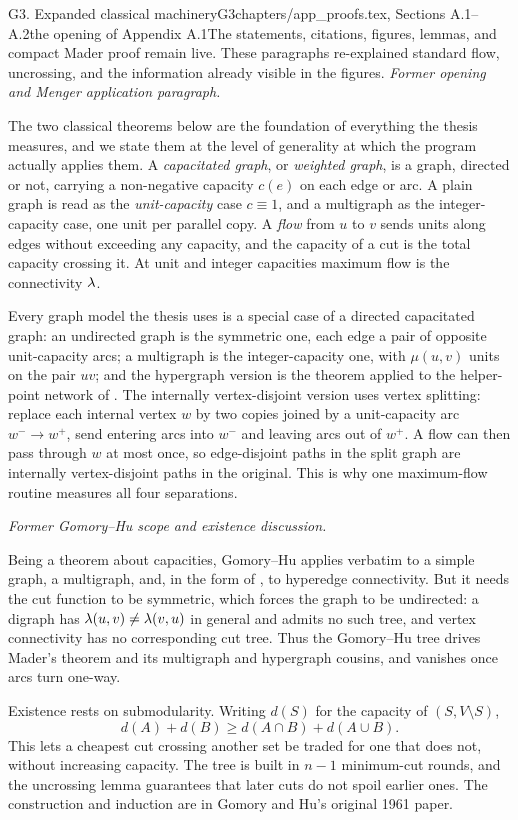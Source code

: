 \begin{offcutrewrite}{G3. Expanded classical machinery}{G3}{chapters/app\_proofs.tex, Sections A.1--A.2}{the opening of Appendix A.1}{The statements, citations, figures, lemmas, and compact Mader proof remain live. These paragraphs re-explained standard flow, uncrossing, and the information already visible in the figures.}
\noindent\emph{Former opening and Menger application paragraph.}

The two classical theorems below are the foundation of everything the thesis measures, and we state them at the level of generality at which the program actually applies them. A \emph{capacitated graph}, or \emph{weighted graph}, is a graph, directed or not, carrying a non-negative capacity $c(e)$ on each edge or arc. A plain graph is read as the \emph{unit-capacity} case $c\equiv1$, and a multigraph as the integer-capacity case, one unit per parallel copy. A \emph{flow} from $u$ to $v$ sends units along edges without exceeding any capacity, and the capacity of a cut is the total capacity crossing it. At unit and integer capacities maximum flow is the connectivity $\lambda$.

Every graph model the thesis uses is a special case of a directed capacitated graph: an undirected graph is the symmetric one, each edge a pair of opposite unit-capacity arcs; a multigraph is the integer-capacity one, with $\mu(u,v)$ units on the pair $uv$; and the hypergraph version is the theorem applied to the helper-point network of . The internally vertex-disjoint version uses vertex splitting: replace each internal vertex $w$ by two copies joined by a unit-capacity arc $w^-\to w^+$, send entering arcs into $w^-$ and leaving arcs out of $w^+$. A flow can then pass through $w$ at most once, so edge-disjoint paths in the split graph are internally vertex-disjoint paths in the original. This is why one maximum-flow routine measures all four separations.

\noindent\emph{Former Gomory--Hu scope and existence discussion.}

Being a theorem about capacities, Gomory--Hu applies verbatim to a simple graph, a multigraph, and, in the form of , to hyperedge connectivity. But it needs the cut function to be symmetric, which forces the graph to be undirected: a digraph has $\lambda(u,v)\ne\lambda(v,u)$ in general and admits no such tree, and vertex connectivity has no corresponding cut tree. Thus the Gomory--Hu tree drives Mader's theorem and its multigraph and hypergraph cousins, and vanishes once arcs turn one-way.

Existence rests on submodularity. Writing $d(S)$ for the capacity of $(S,V\setminus S)$,
\[
d(A)+d(B)\ge d(A\cap B)+d(A\cup B).
\]
This lets a cheapest cut crossing another set be traded for one that does not, without increasing capacity. The tree is built in $n-1$ minimum-cut rounds, and the uncrossing lemma guarantees that later cuts do not spoil earlier ones. The construction and induction are in Gomory and Hu's original 1961 paper.


\end{offcutrewrite}
